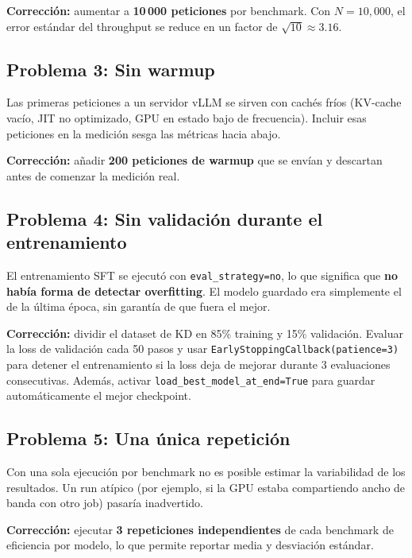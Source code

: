 \documentclass[11pt,a4paper]{article}
\begin{document}
\textbf{Correcci\'on:} aumentar a \textbf{10\,000 peticiones} por
benchmark. Con $N=10{,}000$, el error est\'andar del throughput se
reduce en un factor de $\sqrt{10} \approx 3.16$.

\subsection{Problema 3: Sin warmup}

Las primeras peticiones a un servidor vLLM se sirven con cach\'es
fr\'ios (KV-cache vac\'io, JIT no optimizado, GPU en estado bajo de
frecuencia). Incluir esas peticiones en la medici\'on sesga las
m\'etricas hacia abajo.

\textbf{Correcci\'on:} a\~nadir \textbf{200 peticiones de warmup} que
se env\'ian y descartan antes de comenzar la medici\'on real.

\subsection{Problema 4: Sin validaci\'on durante el entrenamiento}

El entrenamiento SFT se ejecut\'o con \texttt{eval\_strategy=\textquotedbl no\textquotedbl}, lo
que significa que \textbf{no hab\'ia forma de detectar overfitting}. El
modelo guardado era simplemente el de la \'ultima \'epoca, sin garant\'ia
de que fuera el mejor.

\textbf{Correcci\'on:} dividir el dataset de KD en 85\% training y
15\% validaci\'on. Evaluar la loss de validaci\'on cada 50 pasos y
usar \texttt{EarlyStoppingCallback(patience=3)} para detener el
entrenamiento si la loss deja de mejorar durante 3 evaluaciones
consecutivas. Adem\'as, activar \texttt{load\_best\_model\_at\_end=True}
para guardar autom\'aticamente el mejor checkpoint.

\subsection{Problema 5: Una \'unica repetici\'on}

Con una sola ejecuci\'on por benchmark no es posible estimar la
variabilidad de los resultados. Un run at\'ipico (por ejemplo, si la
GPU estaba compartiendo ancho de banda con otro job) pasar\'ia
inadvertido.

\textbf{Correcci\'on:} ejecutar \textbf{3 repeticiones independientes}
de cada benchmark de eficiencia por modelo, lo que permite reportar
media y desviaci\'on est\'andar.
\end{document}
